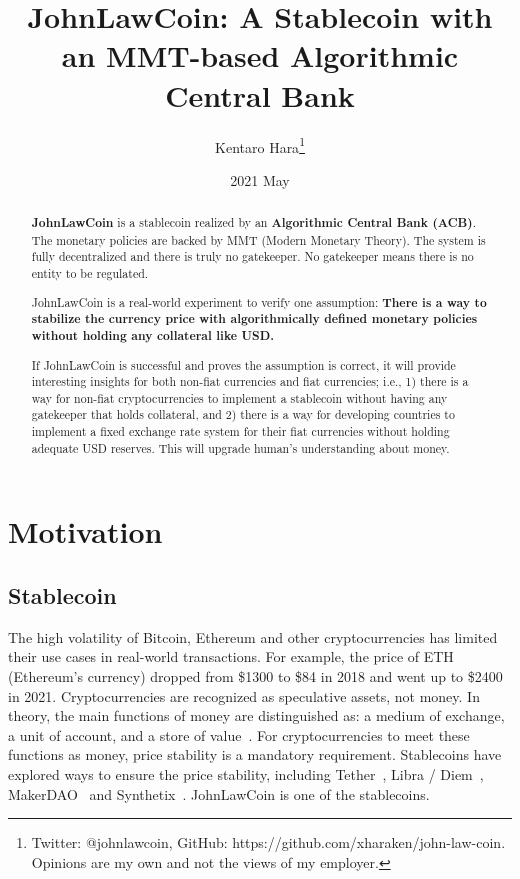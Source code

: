 \documentclass[dvipdfmx,a4paper]{article}
\title{\textbf{JohnLawCoin: A Stablecoin with\\ an MMT-based Algorithmic Central Bank}}
\author{Kentaro Hara\footnote{Twitter: @johnlawcoin, GitHub: https://github.com/xharaken/john-law-coin. Opinions are my own and not the views of my employer.}}
\date{2021 May}
\begin{document}
\maketitle

\begin{abstract}

\textbf{JohnLawCoin} is a stablecoin realized by an \textbf{Algorithmic Central Bank (ACB)}. The monetary policies are backed by MMT (Modern Monetary Theory). The system is fully decentralized and there is truly no gatekeeper. No gatekeeper means there is no entity to be regulated.

JohnLawCoin is a real-world experiment to verify one assumption: \textbf{There is a way to stabilize the currency price with algorithmically defined monetary policies without holding any collateral like USD.}

If JohnLawCoin is successful and proves the assumption is correct, it will provide interesting insights for both non-fiat currencies and fiat currencies; i.e., 1) there is a way for non-fiat cryptocurrencies to implement a stablecoin without having any gatekeeper that holds collateral, and 2) there is a way for developing countries to implement a fixed exchange rate system for their fiat currencies without holding adequate USD reserves. This will upgrade human's understanding about money.

\end{abstract}

\section{Motivation}

\subsection{Stablecoin}

The high volatility of Bitcoin, Ethereum and other cryptocurrencies has limited their use cases in real-world transactions. For example, the price of ETH (Ethereum's currency) dropped from \$1300 to \$84 in 2018 and went up to \$2400 in 2021. Cryptocurrencies are recognized as speculative assets, not money. In theory, the main functions of money are distinguished as: a medium of exchange, a unit of account, and a store of value~\cite{davies2010history,ferguson2008ascent}. For cryptocurrencies to meet these functions as money, price stability is a mandatory requirement. Stablecoins have explored ways to ensure the price stability, including Tether~\cite{tether}, Libra / Diem~\cite{libra}, MakerDAO~\cite{makerdao} and Synthetix~\cite{synthetix}. JohnLawCoin is one of the stablecoins.
\end{document}
